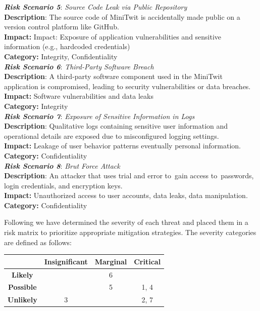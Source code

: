 \documentclass{article}
\begin{document}
\begin{multicols}{2}
\textit{\textbf{Risk Scenario 5}}: \textit{Source Code Leak via Public Repository} \\
\textbf{Description}: The source code of MiniTwit is accidentally made public on a version control platform like GitHub.\\
\textbf{Impact:} Impact: Exposure of application vulnerabilities and sensitive information (e.g., hardcoded credentials)\\
\textbf{Category:}  Integrity, Confidentiality \\

\textit{\textbf{Risk Scenario 6}}: \textit{Third-Party Software Breach} \\
\textbf{Description}: A third-party software component used in the MiniTwit application is compromised, leading to security vulnerabilities or data breaches.\\
\textbf{Impact:} Software vulnerabilities and data leaks\\
\textbf{Category:}  Integrity \\

\textit{\textbf{Risk Scenario 7}}: \textit{Exposure of Sensitive Information in Logs} \\
\textbf{Description}: Qualitative logs containing sensitive user information and operational details are exposed due to misconfigured logging settings.\\
\textbf{Impact:} Leakage of user behavior patterns eventually personal information.\\
\textbf{Category:}  Confidentiality \\

\textit{\textbf{Risk Scenario 8}}: \textit{Brut Force Attack} \\
\textbf{Description}:  An attacker that uses trial and error to gain access to passwords, login credentials, and encryption keys.\\
\textbf{Impact:} Unauthorized access to user accounts, data leaks, data manipulation.\\
\textbf{Category:} Confidentiality  \\

\end{multicols}

Following we have determined the severity of each threat and placed them in a risk matrix to prioritize appropriate mitigation strategies. The severity categories are defined as follows:

\begin{table}[h!]
\centering
\begin{tabular}{|c|c|c|c|}
\hline
\rowcolor{white}
& \textbf{Insignificant} & \textbf{Marginal} & \textbf{Critical} \\
\hline
\textbf{Likely} & \cellcolor{yellow} & \cellcolor{yellow} 6 & \cellcolor{red} \\
\hline
\textbf{Possible} & \cellcolor{green} & \cellcolor{yellow} 5 & \cellcolor{red} 1, 4 \\
\hline
\textbf{Unlikely} & \cellcolor{green} 3 & \cellcolor{green} & \cellcolor{yellow} 2, 7 \\
\hline
\end{tabular}
\end{table}
\end{document}
